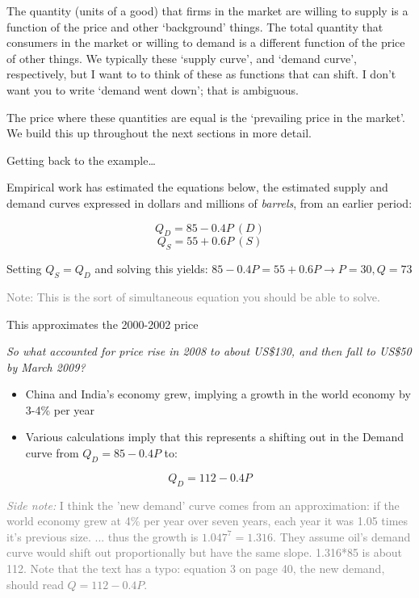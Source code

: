 \documentclass[]{article}
\begin{document}
The quantity (units of a good) that firms in the market are willing to
supply is a function of the price and other `background' things. The
total quantity that consumers in the market or willing to demand is a
different function of the price of other things. We typically these
`supply curve', and `demand curve', respectively, but I want to to think
of these as functions that can shift. I don't want you to write `demand
went down'; that is ambiguous.

The price where these quantities are equal is the `prevailing price in
the market'. We build this up throughout the next sections in more
detail.

Getting back to the example\ldots{}

Empirical work has estimated the equations below, the estimated supply
and demand curves expressed in dollars and millions of \emph{barrels},
from an earlier period:

\[ Q_D = 85 - 0.4P \: (D) \] \[ Q_S = 55 + 0.6P \: (S) \]

Setting \(Q_S=Q_D\) and solving this yields:
\(85 - 0.4P=55+0.6P \rightarrow P = 30, Q = 73\)

\textcolor{gray}{Note: This is the sort of simultaneous equation you should be able to solve.}

This approximates the 2000-2002 price

\bigskip

\emph{So what accounted for price rise in 2008 to about US\$130, and
then fall to US\$50 by March 2009?}

\begin{itemize}
\item
  China and India's economy grew, implying a growth in the world economy
  by 3-4\% per year
\item
  Various calculations imply that this represents a shifting out in the
  Demand curve from \(Q_D = 85 - 0.4P\) to:
\end{itemize}

\[Q_D = 112 - 0.4P\]

\textcolor{gray}{\emph{Side note:} I think the 'new demand' curve comes from an approximation:  if the world economy grew at 4\% per year over seven years, each year it was 1.05 times it's previous size. ... thus the growth is $1.047^7=1.316$.
They assume oil's demand curve would shift out proportionally but have the same slope. 1.316*85 is about 112.
Note that the text has a typo: equation 3 on page 40, the new demand, should read $Q=112-0.4P$.}
\end{document}
